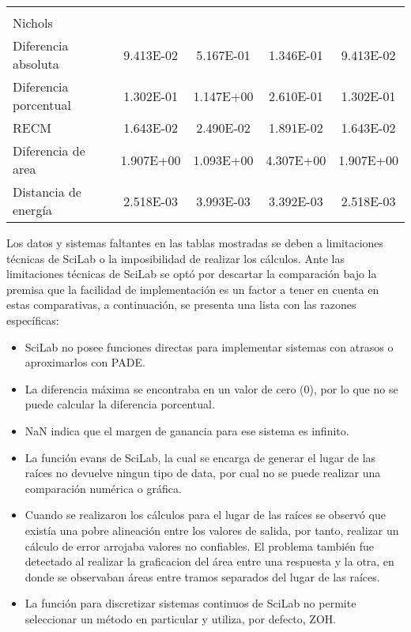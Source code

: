 {\begin{longtable}{l @{\extracolsep{\fill}} cccc}
            & & & & \\
            Nichols                & & & & \\ \cmidrule{1-1}
            Diferencia absoluta    & \num{9.413E-02} & \num{5.167E-01} & \num{1.346E-01} & \num{9.413E-02}  \\
            Diferencia porcentual  & \num{1.302E-01} & \num{1.147E+00} & \num{2.610E-01} & \num{1.302E-01}  \\
            RECM                   & \num{1.643E-02} & \num{2.490E-02} & \num{1.891E-02} & \num{1.643E-02}  \\
            Diferencia de area     & \num{1.907E+00} & \num{1.093E+00} & \num{4.307E+00} & \num{1.907E+00}  \\
            Distancia de energía   & \num{2.518E-03} & \num{3.993E-03} & \num{3.392E-03} & \num{2.518E-03}  \\
        \end{longtable}}

        Los datos y sistemas faltantes en las tablas mostradas se deben a limitaciones técnicas de SciLab o la imposibilidad de realizar los cálculos. Ante las limitaciones técnicas de SciLab se optó por descartar la comparación bajo la premisa que la facilidad de implementación es un factor a tener en cuenta en estas comparativas, a continuación, se presenta una lista con las razones específicas:

        \begin{itemize}[leftmargin=\parindent]
            \item SciLab no posee funciones directas para implementar sistemas con atrasos o aproximarlos con PADE.
            \item La diferencia máxima se encontraba en un valor de cero (0), por lo que no se puede calcular la diferencia porcentual.
            \item NaN indica que el margen de ganancia para ese sistema es infinito.
            \item La función evans de SciLab, la cual se encarga de generar el lugar de las raíces no devuelve ningun tipo de data, por cual no se puede realizar una comparación numérica o gráfica.
            \item Cuando se realizaron los cálculos para el lugar de las raíces se observó que existía una pobre alineación entre los valores de salida, por tanto, realizar un cálculo de error arrojaba valores no confiables. El problema también fue detectado al realizar la graficacion del área entre una respuesta y la otra, en donde se observaban áreas entre tramos separados del lugar de las raíces.
            \item La función para discretizar sistemas continuos de SciLab no permite seleccionar un método en particular y utiliza, por defecto, ZOH.
        \end{itemize}

